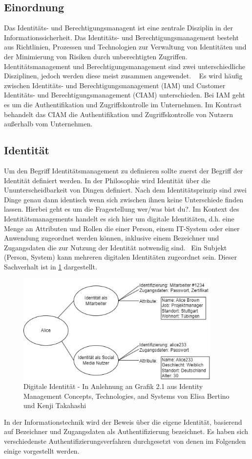 \documentclass[12pt]{article}
\begin{document}
\subsection{Einordnung}
Das Identitäts- und Berechtigungsmanagent ist eine zentrale Disziplin in der Informationssicherheit. Das Identitäts- und Berechtigungsmanagement besteht aus Richtlinien, Prozessen und Technologien zur Verwaltung von Identitäten und der Minimierung von Risiken durch unberechtigten Zugriffen. Identitätsmanagement und Berechtigungsmanagement sind zwei unterschiedliche Disziplinen, jedoch werden diese meist zusammen angewendet. ~\cite{mohammed2017systematic} Es wird häufig zwischen Identitäts- und Berechtigungsmanagement (IAM) und Customer Identitäts- und Berechtigungsmanagement (CIAM) unterschieden. Bei IAM geht es um die Authentifikation und Zugriffskontrolle im Unternehmen. Im Kontrast behandelt das CIAM die Authentifikation und Zugriffskontrolle von Nutzern außerhalb vom Unternehmen.~\cite{mohammed2017systematic} ~\cite{liveretos2022customer}
\subsection{Identität}
Um den Begriff Identitätsmanagement zu definieren sollte zuerst der Begriff der Identität definiert werden. In der Philosophie wird Identität über die Ununterscheidbarkeit von Dingen definiert. Nach dem Identitätsprinzip sind zwei Dinge genau dann identisch wenn sich zwischen ihnen keine Unterschiede finden lassen. Hierbei geht es um die Fragestellung \glqq{}wer/was bist du?\grqq{}. Im Kontext des Identitätsmanagements handelt es sich hier um digitale Identitäten, d.h. eine Menge an Attributen und Rollen die einer Person, einem IT-System oder einer Anwendung zugeordnet werden können, inklusive einem Bezeichner und Zugangsdaten die zur Nutzung der Identität notwendig sind.~\cite{tsolkas2017} Ein Subjekt (Person, System) kann mehreren digitalen Identitäten zugeordnet sein. Dieser Sachverhalt ist in \cref{fig:identity} dargestellt.
\begin{figure}[H]
  \centering
  \includegraphics[width=0.9\textwidth]{assets/identity.png}
  \caption{Digitale Identität - In Anlehnung an Grafik 2.1 aus Identity Management Concepts, Technologies, and Systems von Elisa Bertino und Kenji Takahashi}\label{fig:identity}
\end{figure}
In der Informationstechnik wird der Beweis über die eigene Identität, basierend auf Bezeichner und Zugangsdaten als Authentifizierung bezeichnet. Es haben sich verschiedenste Authentifizierungsverfahren durchgesetzt von denen im Folgenden einige vorgestellt werden.
\end{document}

